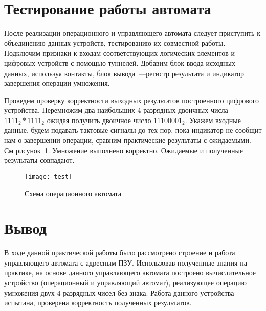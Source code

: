\documentclass[a4paper,14pt]{extarticle}
\begin{document}
\section{Тестирование работы автомата}
После реализации операционного и управляющего автомата следует приступить к объединению данных устройств, тестированию их совместной работы. Подключим признаки к входам соответствующих логических элементов и цифровых устройств с помощью туннелей. Добавим блок ввода исходных данных, используя контакты, блок вывода~---регистр результата и индикатор завершения операции умножения.

Проведем проверку корректности выходных результатов построенного цифрового устройства. Перемножим два наибольших 4-разрядных двоичных числа $1111_2 \ast 1111_2$ ожидая получить двоичное число $11100001_2$. Укажем входные данные, будем подавать тактовые сигналы до тех пор, пока индикатор не сообщит нам о завершении операции, сравним практические результаты с ожидаемыми. См рисунок~\ref{img:test}. Умножение выполнено корректно. Ожидаемые и полученные результаты совпадают.
\begin{figure}[h!]
	\centering
	\texttt{[image: test]}
	\caption {Схема операционного автомата}
	\label{img:test}
\end{figure}

\newpage
\section {Вывод}
В ходе данной практической работы было рассмотрено строение и работа управляющего автомата с адресным ПЗУ. Использовав полученные знания на практике, на основе данного управляющего автомата построено вычислительное устройство (операционный и управляющий автомат), реализующее операцию умножения двух 4-разрядных чисел без знака. Работа данного устройства испытана, проверена корректность полученных результатов. 
\end{document}
